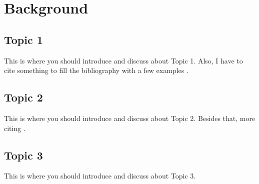 \chapter[Background]{Background}
\section{Topic 1}
This is where you should introduce and discuss about Topic 1. Also, I have to cite something to fill the bibliography with a few examples \cite{docs:dind}.

\section{Topic 2}
This is where you should introduce and discuss about Topic 2. Besides that, more citing \cite{tool:Kubernetes}.

\section{Topic 3}
This is where you should introduce and discuss about Topic 3.